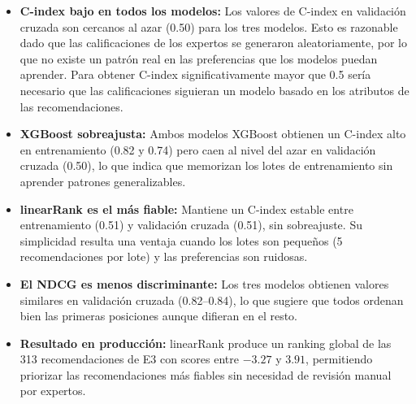 \documentclass[11pt,a4paper]{article}
\begin{document}
\begin{itemize}
    \item \textbf{C-index bajo en todos los modelos:} Los valores de C-index
    en validación cruzada son cercanos al azar (0.50) para los tres modelos.
    Esto es razonable dado que las calificaciones de los expertos se generaron
    aleatoriamente, por lo que no existe un patrón real en las preferencias
    que los modelos puedan aprender. Para obtener C-index significativamente
    mayor que 0.5 sería necesario que las calificaciones siguieran un modelo
    basado en los atributos de las recomendaciones.

    \item \textbf{XGBoost sobreajusta:} Ambos modelos XGBoost obtienen un
    C-index alto en entrenamiento (0.82 y 0.74) pero caen al nivel del azar
    en validación cruzada (0.50), lo que indica que memorizan los lotes de
    entrenamiento sin aprender patrones generalizables.

    \item \textbf{linearRank es el más fiable:} Mantiene un C-index estable
    entre entrenamiento (0.51) y validación cruzada (0.51), sin sobreajuste.
    Su simplicidad resulta una ventaja cuando los lotes son pequeños
    (5 recomendaciones por lote) y las preferencias son ruidosas.

    \item \textbf{El NDCG es menos discriminante:} Los tres modelos obtienen
    valores similares en validación cruzada (0.82--0.84), lo que sugiere que
    todos ordenan bien las primeras posiciones aunque difieran en el resto.

    \item \textbf{Resultado en producción:} linearRank produce un ranking
    global de las 313 recomendaciones de E3 con scores entre $-3.27$ y
    $3.91$, permitiendo priorizar las recomendaciones más fiables sin
    necesidad de revisión manual por expertos.
\end{itemize}
\end{document}
